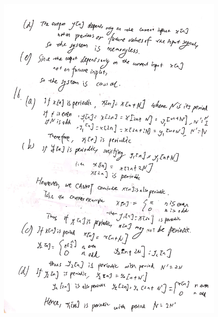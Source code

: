 \documentclass[a4paper]{article}
\begin{document}
\begin{figure}[H]
  \begin{center}
    \includegraphics[width=1\textwidth]{15(d)-16.jpg}
  \end{center}
\end{figure}
\end{document}
